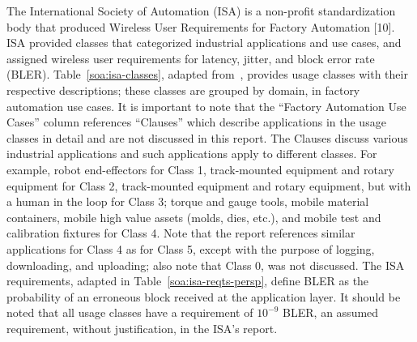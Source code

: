 The International Society of Automation (ISA) is a non-profit standardization body that produced Wireless User Requirements for Factory Automation [10]. ISA provided classes that categorized industrial applications and use cases, and assigned wireless user requirements for latency, jitter, and block error rate (BLER). Table~\ref{soa:isa-classes}, adapted from~\cite{ISATR100-2011}, provides usage classes with their respective descriptions; these classes are grouped by domain, in factory automation use cases. It is important to note that the “Factory Automation Use Cases” column references “Clauses” which describe applications in the usage classes in detail and are not discussed in this report. The Clauses discuss various industrial applications and such applications apply to different classes. For example, robot end-effectors for Class 1, track-mounted equipment and rotary equipment for Class 2, track-mounted equipment and rotary equipment, but with a human in the loop for Class 3; torque and gauge tools, mobile material containers, mobile high value assets (molds, dies, etc.), and mobile test and calibration fixtures for Class 4. Note that the report references similar applications for Class 4 as for Class 5, except with the purpose of logging, downloading, and uploading; also note that Class 0, was not discussed. The ISA requirements, adapted in Table~\ref{soa:isa-reqts-persp}, define BLER as the probability of an erroneous block received at the application layer. It should be noted that all usage classes have a requirement of $10^{-9}$ BLER, an assumed requirement, without justification, in the ISA’s report. 

